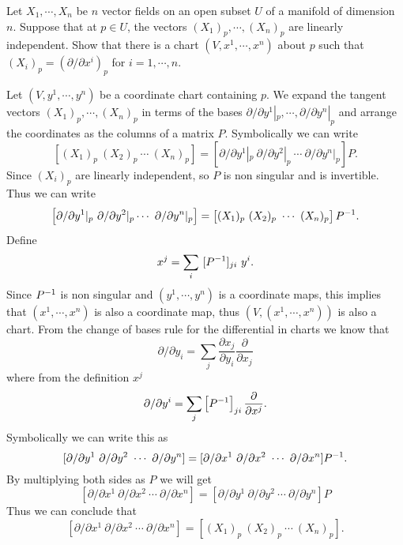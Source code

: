 \begin{problem}
	Let $ X_1,\cdots,X_n $ be $ n $ vector fields on an open subset $ U $ of a manifold of dimension $ n $. Suppose that at $ p \in U $, the vectors $ (X_1)_p,\cdots,(X_n)_p $ are linearly independent. Show that there is a chart $ (V,x^1,\cdots,x^n) $ about $ p $ such that $ (X_i)_p = (\partial/\partial x^i)_p $ for $ i = 1,\cdots,n $.
\end{problem}
\begin{solution}
	Let $ (V,y^1,\cdots,y^n) $ be a coordinate chart containing $ p $. We expand the tangent vectors $ (X_1)_p,\cdots,(X_n)_p $ in terms of the bases $ \partial/\partial y^1|_{p},\cdots,\partial/\partial y^n|_{p} $ and arrange the coordinates as the columns of a matrix $ P $. Symbolically we can write
	\[ \left[(X_1)_p\ (X_2)_p\ \cdots\ (X_n)_p\right] = \left[\partial/\partial y^1|_{p}\ \partial/\partial y^2|_{p}\ \cdots\ \partial/\partial y^n|_{p}\right] P.
	 \]
	Since $ (X_i)_p $ are linearly independent, so $ P $ is non singular and is invertible. Thus we can write
	\[ \left[ \partial/\partial y^1|_{p}\ \partial/\partial y^2|_{p} \cdots\ \partial/\partial y^n|_{p} \right] = \left[ (X_1)_p\ (X_2)_p\ \cdots\ (X_n)_p \right] \inv{P}. \]
	Define
	\[ x^j = \sum_i\ [\inv{P}]_{ji}\ y^i. \]
	Since $ P^{-1} $ is non singular and $ (y^1,\cdots,y^n) $ is a coordinate maps, this implies that $ (x^1,\cdots,x^n) $ is also a coordinate map, thus $ (V,(x^1,\cdots,x^n)) $ is also a chart. From the change of bases rule for the differential in charts we know that
	\[ \partial/\partial y_i = \sum_j \frac{\partial x_j}{\partial y_i} \frac{\partial}{\partial x_j} \]
	where from the definition $ x^j $
	\[ \partial/\partial y^i = \sum_j \left[ P^{-1} \right]_{ji} \frac{\partial }{\partial x^j}. \]
	Symbolically we can write this as
	\[ [ \partial/\partial y^1\ \partial/\partial y^2\ \cdots\ \partial/\partial y^n ] = [\partial/\partial x^1\ \partial/\partial x^2\ \cdots\ \partial/\partial x^n] \inv{P}. \]
	By multiplying both sides as $ P $ we will get
	\[ [\partial/\partial x^1\ \partial/\partial x^2\ \cdots\ \partial/\partial x^n] =  [ \partial/\partial y^1\ \partial/\partial y^2\ \cdots\ \partial/\partial y^n ]P  \]
	Thus we can conclude that 
	\[ [\partial/\partial x^1\ \partial/\partial x^2\ \cdots\ \partial/\partial x^n] = \left[(X_1)_p\ (X_2)_p\ \cdots\ (X_n)_p\right]. \]
\end{solution}


